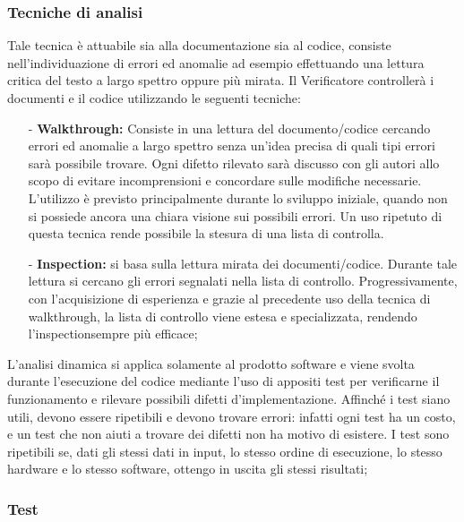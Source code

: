 \documentclass[a4paper,11pt]{article}
\begin{document}
				\subsubsection{Tecniche di analisi}
				Tale tecnica è attuabile sia alla documentazione sia al codice, consiste nell'individuazione di errori ed anomalie ad esempio effettuando una lettura critica del testo a largo spettro oppure più mirata. Il Verificatore controllerà i documenti e il codice utilizzando le seguenti tecniche:
				\begin{itemize}
				\item[-]\textbf{Walkthrough\addglos:} Consiste in una lettura del documento/codice cercando errori ed anomalie a largo spettro senza un'idea precisa di quali tipi errori sarà possibile trovare. Ogni difetto rilevato sarà discusso con gli autori allo scopo di evitare incomprensioni e concordare sulle modifiche necessarie. L'utilizzo è previsto principalmente durante lo sviluppo iniziale, quando non si possiede ancora una chiara visione sui possibili errori. Un uso ripetuto di questa tecnica rende possibile la stesura di una lista di controlla. 		
				
				\item[-]\textbf{Inspection\addglos:} si basa sulla lettura mirata dei documenti/codice. Durante tale lettura si cercano gli errori segnalati nella lista di controllo. Progressivamente, con l'acquisizione di esperienza e grazie al precedente uso della tecnica di walkthrough\addglos, la lista di controllo viene estesa e specializzata, rendendo l'inspection\addglos sempre più efficace;
				\end{itemize}
				
				L'analisi dinamica si applica solamente al prodotto software e viene svolta durante l'esecuzione del codice mediante l'uso di appositi test per verificarne il funzionamento e rilevare possibili difetti d'implementazione. Affinché i test siano utili, devono essere ripetibili e devono trovare errori: infatti ogni test ha un costo, e un test che non aiuti a trovare dei difetti non ha motivo di esistere. I test sono ripetibili se, dati gli stessi dati in input, lo stesso ordine di esecuzione, lo stesso hardware e lo stesso software, ottengo in uscita gli stessi risultati;
				
				\subsubsection{Test}
								
\end{document}
